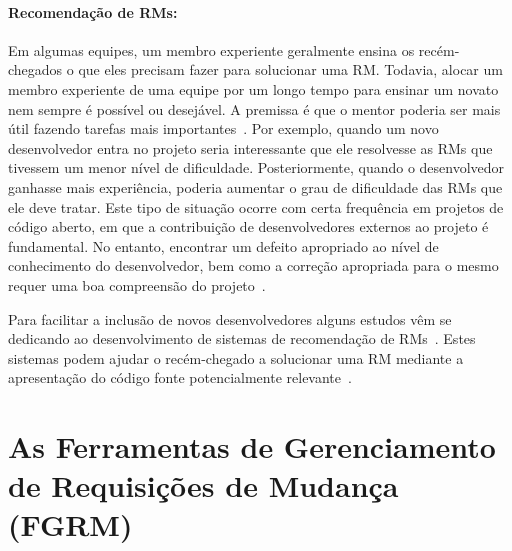 \paragraph{Recomendação de RMs:}

Em algumas equipes, um membro experiente geralmente ensina os recém-chegados o
que eles precisam fazer para solucionar uma RM\@. Todavia, alocar um membro
experiente de uma equipe por um longo tempo para ensinar um novato nem sempre é
possível ou desejável. A premissa é que o mentor poderia ser mais útil fazendo
tarefas mais importantes~\cite{malheiros2012source}. Por exemplo, quando um novo
desenvolvedor entra no projeto seria interessante que ele resolvesse as RMs que
tivessem um menor nível de dificuldade. Posteriormente, quando o desenvolvedor
ganhasse mais experiência, poderia aumentar o grau de dificuldade das RMs que
ele deve tratar. Este tipo de situação ocorre com certa frequência em projetos
de código aberto, em que a contribuição de desenvolvedores externos ao projeto é
fundamental. No entanto, encontrar um defeito apropriado ao nível de
conhecimento do desenvolvedor, bem como a correção apropriada para o mesmo
requer uma boa compreensão do projeto~\cite{Wang2011bug}.

Para facilitar a inclusão de novos desenvolvedores alguns estudos vêm se
dedicando ao desenvolvimento de sistemas de recomendação de
RMs~\cite{malheiros2012source, Wang2011bug}. Estes sistemas podem ajudar o
recém-chegado a solucionar uma RM mediante a apresentação do código fonte
potencialmente relevante~\cite{malheiros2012source}.


\section{As Ferramentas de Gerenciamento de Requisições de Mudança (FGRM)}
\label{sec:ferramentas_de_gerenciamento_requisicoes_de_mudanca}


